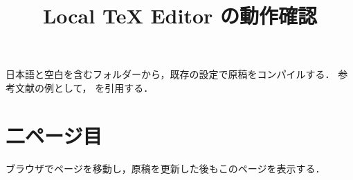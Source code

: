 \documentclass[uplatex,dvipdfmx]{jsarticle}
\title{Local TeX Editor の動作確認}
\author{}
\date{}
\begin{document}
\maketitle

日本語と空白を含むフォルダーから，既存の設定で原稿をコンパイルする．
参考文献の例として，\citep{sample2026} を引用する．

\newpage
\section{二ページ目}
ブラウザでページを移動し，原稿を更新した後もこのページを表示する．





\end{document}

